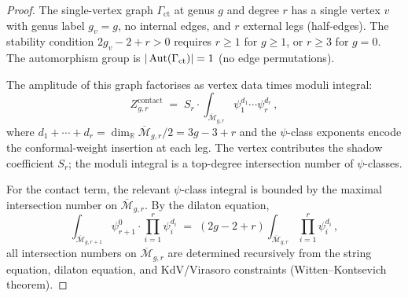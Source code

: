 \begin{proof}
The single-vertex graph $\Gamma_{\mathrm{ct}}$ at genus $g$ and
degree $r$ has a single vertex $v$ with genus label $g_v = g$,
no internal edges, and $r$ external legs (half-edges). The
stability condition $2g_v - 2 + r > 0$ requires $r \geq 1$ for
$g \geq 1$, or $r \geq 3$ for $g = 0$. The automorphism group
is $|\operatorname{Aut}(\Gamma_{\mathrm{ct}})| = 1$ (no edge permutations).

The amplitude of this graph factorises as vertex data times moduli
integral:
\[
Z_{g,r}^{\mathrm{contact}}
\;=\;
S_r \cdot \int_{\overline{\mathcal{M}}_{g,r}}
\psi_1^{d_1} \cdots \psi_r^{d_r}\,,
\]
where $d_1 + \cdots + d_r = \dim_\mathbb{R}
\overline{\mathcal{M}}_{g,r}/2 = 3g - 3 + r$ and the $\psi$-class
exponents encode the conformal-weight insertion at each leg.
The vertex contributes the shadow coefficient $S_r$; the moduli
integral is a top-degree intersection number of $\psi$-classes.

For the contact term, the relevant $\psi$-class integral is
bounded by the maximal intersection number on
$\overline{\mathcal{M}}_{g,r}$. By the dilaton equation,
\begin{equation}\label{eq:dilaton-recursion}
\int_{\overline{\mathcal{M}}_{g,r+1}} \psi_{r+1}^0 \cdot
\prod_{i=1}^r \psi_i^{d_i}
\;=\; (2g - 2 + r) \int_{\overline{\mathcal{M}}_{g,r}}
\prod_{i=1}^r \psi_i^{d_i}\,,
\end{equation}
all intersection numbers on $\overline{\mathcal{M}}_{g,r}$
are determined recursively from the string equation, dilaton
equation, and KdV/Virasoro constraints
(Witten--Kontsevich theorem).


\end{proof}
